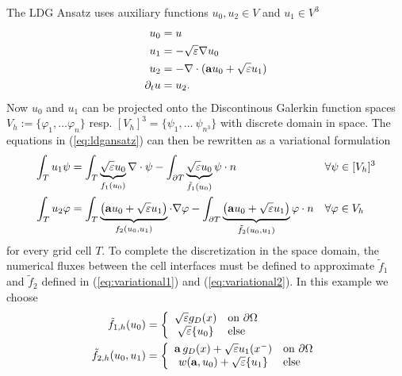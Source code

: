 The LDG Ansatz uses auxiliary functions $u_{0}, u_{2} \in V$ and $u_{1} \in V^{3}$
%
\begin{equation}
  \label{eq:ldgansatz}
  \begin{aligned}
    u_{0} &= u \\
    u_{1} &= - \sqrt{\varepsilon} \nabla u_{0}  \\
    u_{2} &= - \nabla \cdot (\mathbf{a} u_{0} + \sqrt{\varepsilon} u_{1})  \\
    \partial_{t} u &= u_{2}.
  \end{aligned}
\end{equation}
%
Now $u_{0}$ and $u_{1}$ can be projected onto the Discontinous Galerkin
function spaces $V_{h} := \{\varphi_{1},\dots \varphi_{n}\}$ resp.
$[V_{h}]^{3}=\{\psi_{1},\dots\ \psi_{n^{3}}\}$ with discrete domain in space. The equations
in (\ref{eq:ldgansatz}) can then be rewritten as a variational formulation 
%
\newcommand{\ftilde}{\tilde{f}}
\begin{align}
  \label{eq:variational1}
  \int_{T}^{} u_{1} \psi &= \int_{T}^{}\underbrace{\sqrt{\varepsilon}u_{0}}_{f_{1}(u_{0})} \nabla \cdot \psi
  {}                       - \int_{\partial T}^{}\underbrace{\sqrt{\varepsilon}u_{0}}_{\ftilde_{1}(u_{0})} \psi \cdot n 
  {}                                   && \forall{\psi}\in [V_{h}]^{3}\\
  \label{eq:variational2}
  \int_{T}^{} u_{2} \varphi &= \int_{T}^{} \underbrace{\left(\velo u_{0} + \sqrt{\varepsilon} u_{1}\right)}_{
  {}                                                      f_{2}(u_{0},u_{1})} \cdot \nabla \varphi
  {}                         - \int_{\partial T}^{} \underbrace{\left(\velo u_{0} + \sqrt{\varepsilon} u_{1}\right)}_{
  {}                                                      \ftilde_{2}(u_{0},u_{1})} \varphi \cdot n
  {}                                         && \forall{\varphi} \in V_{h}
\end{align}
for every grid cell $T$. 
%
To complete the discretization in the space domain, the numerical fluxes
between the cell interfaces must be defined to approximate $\ftilde_{1}$ and
$\ftilde_{2}$ defined in (\ref{eq:variational1}) and (\ref{eq:variational2}).
In this example we choose
%
\begin{align}
  \label{eq:flux1}
  \ftilde_{1,h}(u_{0}) &= 
  \left\{
  \begin{array}{cl}
    \sqrt{\varepsilon} g_{D}(x)  & \mbox{on}\ \partial\Omega \\
    \sqrt{\varepsilon} \{u_{0}\} & \mbox{else}
  \end{array}
  \right.
\\
  \label{eq:flux2}
  \ftilde_{2,h}(u_{0},u_{1}) &=
  \left\{
  \begin{array}[]{cl}
    \velo\, g_{D}(x) + \sqrt{\varepsilon}u_{1}(x^{-}) & \mbox{on}\ \partial\Omega \\
    w(\velo, u_{0})  + \sqrt{\varepsilon}\{u_{1}\} & \mbox{else}
  \end{array}
  \right.
\end{align}
